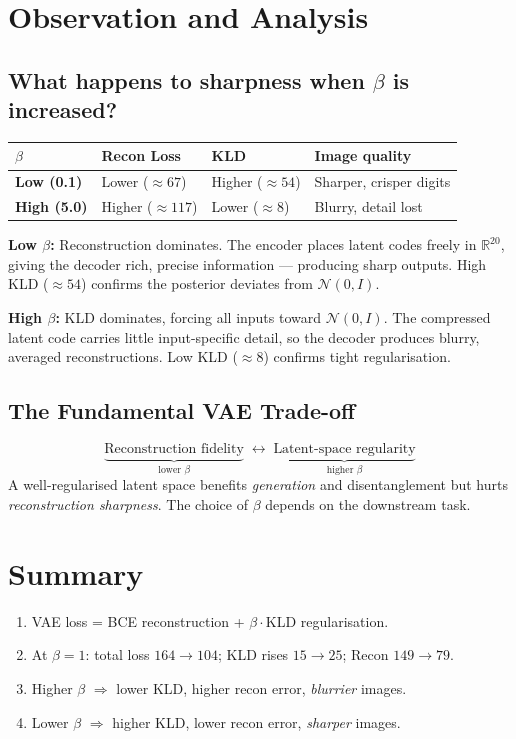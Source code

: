\documentclass[11pt, a4paper]{article}
\begin{document}
\section{Observation and Analysis}

\subsection*{What happens to sharpness when $\beta$ is increased?}
\begin{center}\small
\begin{tabular}{>{\bfseries}p{1.8cm} p{2.5cm} p{2.5cm} p{6.5cm}}
  \toprule
  $\beta$ & Recon Loss & KLD & Image quality \\
  \midrule
  Low (0.1)  & Lower ($\approx67$)  & Higher ($\approx54$) & Sharper, crisper digits \\
  High (5.0) & Higher ($\approx117$) & Lower ($\approx8$)   & Blurry, detail lost \\
  \bottomrule
\end{tabular}
\end{center}

\textbf{Low $\beta$:} Reconstruction dominates. The encoder places latent codes
freely in $\mathbb{R}^{20}$, giving the decoder rich, precise information ---
producing sharp outputs. High KLD ($\approx54$) confirms the posterior deviates
from $\mathcal{N}(0,I)$.

\textbf{High $\beta$:} KLD dominates, forcing all inputs toward $\mathcal{N}(0,I)$.
The compressed latent code carries little input-specific detail, so the decoder
produces blurry, averaged reconstructions. Low KLD ($\approx8$) confirms tight
regularisation.

\subsection*{The Fundamental VAE Trade-off}
\[
  \underbrace{\text{Reconstruction fidelity}}_{\text{lower }\beta}
  \;\longleftrightarrow\;
  \underbrace{\text{Latent-space regularity}}_{\text{higher }\beta}
\]
A well-regularised latent space benefits \emph{generation} and disentanglement
but hurts \emph{reconstruction sharpness}. The choice of $\beta$ depends on the
downstream task.

\section{Summary}
\begin{enumerate}
  \item VAE loss = BCE reconstruction + $\beta\cdot$KLD regularisation.
  \item At $\beta=1$: total loss $164\to104$; KLD rises $15\to25$; Recon $149\to79$.
  \item Higher $\beta$ $\Rightarrow$ lower KLD, higher recon error, \emph{blurrier} images.
  \item Lower $\beta$ $\Rightarrow$ higher KLD, lower recon error, \emph{sharper} images.
\end{enumerate}
\end{document}
